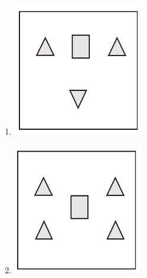 \documentclass[journal,12pt,onecolumn]{IEEEtran}
\theoremstyle{remark}
\begin{document}
\begin{enumerate}
\begin{enumerate}
    \item \includegraphics[width=\columnwidth]{figs/fig_5.2.png}
    \item \includegraphics[width=\columnwidth]{figs/fig_5.3.png}

\end{enumerate}
\end{enumerate}
\end{document}
